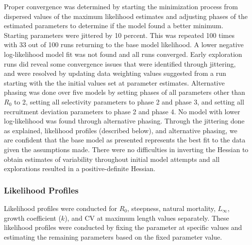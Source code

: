 \documentclass[11pt,
  english,
  a4paper,
]{article}
\begin{document}
\leavevmode\tagmcend\tagstructend


Proper convergence was determined by starting the minimization process from dispersed values of the maximum likelihood estimates and adjusting phases of the estimated parameters to determine if the model found a better minimum. Starting parameters were jittered by 10 percent. This was repeated 100 times with 33 out of 100 runs returning to the base model likelihood. A lower negative log-likelihood model fit was not found and all runs converged. Early exploration runs did reveal some convergence issues that were identified through jittering, and were resolved by updating data weighting values suggested from a run starting with the the initial values set at parameter estimates. Alternative phasing was done over five models by setting phases of all parameters other than {\(R_0\)\leavevmode\tagmcend\tagstructend} to 2, setting all selectivity parameters to phase 2 and phase 3, and setting all recruitment deviation parameters to phase 2 and phase 4. No model with lower log-likelihood was found through alternative phasing. Through the jittering done as explained, likelihood profiles (described below), and alternative phasing, we are confident that the base model as presented represents the best fit to the data given the assumptions made. There were no difficulties in inverting the Hessian to obtain estimates of variability throughout initial model attempts and all explorations resulted in a positive-definite Hessian.

\leavevmode\tagmcend\tagstructend\par


\hypertarget{likelihood-profiles}{%
\subsubsection{Likelihood Profiles}\label{likelihood-profiles}}

\leavevmode\tagmcend\tagstructend


Likelihood profiles were conducted for {\(R_0\)\leavevmode\tagmcend\tagstructend}, steepness, natural mortality, {\(L_{\infty}\)\leavevmode\tagmcend\tagstructend}, growth coefficient ({\(k\)\leavevmode\tagmcend\tagstructend}), and CV at maximum length values separately. These likelihood profiles were conducted by fixing the parameter at specific values and estimating the remaining parameters based on the fixed parameter value.
\end{document}

